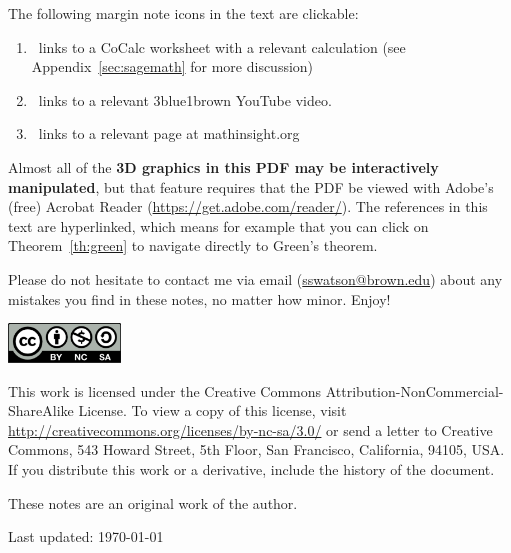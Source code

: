 \documentclass{watsonbook}
\begin{document}
The following margin note icons in the text are clickable:
\begin{enumerate}[itemsep=6pt, topsep = -6pt]
  \item \href{http://cocalc.com}{\cocalc}\,
links to a CoCalc worksheet with a relevant calculation (see Appendix~\ref{sec:sagemath} for more
discussion)
\item \href{http://3blue1brown.com}{\tbob} \, links to a relevant 3blue1brown YouTube video.
\item \href{http://mathinsight.org}{\mi} \, links to a relevant page at mathinsight.org
\end{enumerate}

\vspace{6pt}

Almost all of the \textbf{3D graphics in this PDF may be interactively manipulated},
but that feature requires that the PDF be viewed with Adobe's (free) Acrobat
Reader
(\href{https://get.adobe.com/reader/}{\url{https://get.adobe.com/reader/}}). The
references in this text are hyperlinked, which means for example that you can click on
Theorem~\ref{th:green} to navigate directly to Green's theorem. 

Please do not hesitate to contact me via email (\url{sswatson@brown.edu})
about any mistakes you find in these notes, no matter how
minor. Enjoy!

\newpage

\null\vfill

\includegraphics[width=3cm]{figures/cc-by-nc-sa.pdf} \\
{\small
This work is licensed under the Creative Commons
Attribution-NonCommercial-ShareAlike License. To view a copy of this
license, visit 
\url{http://creativecommons.org/licenses/by-nc-sa/3.0/} 
or
send a letter to Creative Commons, 543 Howard Street, 5th Floor, San
Francisco, California, 94105, USA. If you distribute this work or a
derivative, include the history of the document.

These notes are an original work of the author.

Last updated: \today 
}

\vspace{5cm}


\newpage 

\tableofcontents

\newpage 
\end{document}
